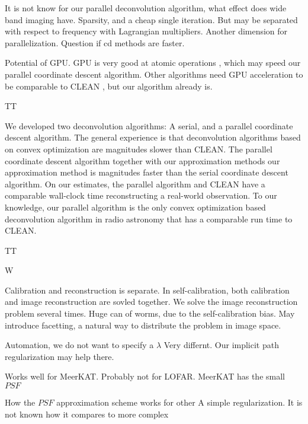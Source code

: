 It is not know for our parallel deconvolution algorithm, what effect does wide band imaging have. 
Sparsity, and a cheap single iteration.
But may be separated with respect to frequency with Lagrangian multipliers. Another dimension for parallelization. 
Question if cd methods are faster.


Potential of GPU. GPU is very good at atomic operations \cite{keplerShuffle}, which may speed our parallel coordinate descent algorithm. Other algorithms need GPU acceleration to be comparable to CLEAN \cite{dabbech2015moresane}, but our algorithm already is.


TT


We developed two deconvolution algorithms: A serial, and a parallel coordinate descent algorithm. The general experience is that deconvolution algorithms based on convex optimization are magnitudes slower than CLEAN\cite{offringa2017optimized}. The parallel coordinate descent algorithm together with our approximation methods our approximation method is magnitudes faster than the serial coordinate descent algorithm. On our estimates, the parallel algorithm and CLEAN have a comparable wall-clock time reconstructing a real-world observation. To our knowledge, our parallel algorithm is the only convex optimization based deconvolution algorithm in radio astronomy that has a comparable run time to CLEAN.

TT












W

Calibration and reconstruction is separate. In self-calibration, both calibration and image reconstruction are sovled together. We solve the image reconstruction problem several times.
Huge can of worms, due to the self-calibration bias.
May introduce facetting, a natural way to distribute the problem in image space.

Automation, we do not want to specify a $\lambda$
Very differnt.
Our implicit path regularization may help there.


Works well for MeerKAT. Probably not for LOFAR. MeerKAT has the small $PSF$










How the $PSF$ approximation scheme works for other 
A simple regularization. It is not known how it compares to more complex 



